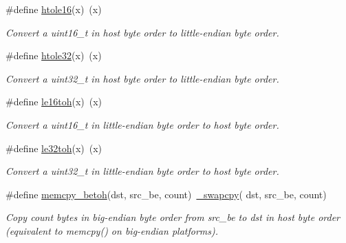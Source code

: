 \begin{DoxyCompactItemize}
\mbox{\label{group__util__byteorder_ga3ea73a6089f61223b225c46e2ba58a47}} 
\#define \hyperlink{group__util__byteorder_ga3ea73a6089f61223b225c46e2ba58a47}{htole16}(x)~(x)
\begin{DoxyCompactList}\small\item\em Convert a uint16\+\_\+t in host byte order to little-\/endian byte order. \end{DoxyCompactList}\item 
\mbox{\label{group__util__byteorder_ga9bea1e76e277f13ae39ac86095510bfa}} 
\#define \hyperlink{group__util__byteorder_ga9bea1e76e277f13ae39ac86095510bfa}{htole32}(x)~(x)
\begin{DoxyCompactList}\small\item\em Convert a uint32\+\_\+t in host byte order to little-\/endian byte order. \end{DoxyCompactList}\item 
\mbox{\label{group__util__byteorder_ga684a5d26d1989cbd925e97292cc81c72}} 
\#define \hyperlink{group__util__byteorder_ga684a5d26d1989cbd925e97292cc81c72}{le16toh}(x)~(x)
\begin{DoxyCompactList}\small\item\em Convert a uint16\+\_\+t in little-\/endian byte order to host byte order. \end{DoxyCompactList}\item 
\mbox{\label{group__util__byteorder_gad2dfbafcefb3add65ea44e581398e90a}} 
\#define \hyperlink{group__util__byteorder_gad2dfbafcefb3add65ea44e581398e90a}{le32toh}(x)~(x)
\begin{DoxyCompactList}\small\item\em Convert a uint32\+\_\+t in little-\/endian byte order to host byte order. \end{DoxyCompactList}\item 
\mbox{\label{group__util__byteorder_gad871f144718432cb04f76e79aec80c87}} 
\#define \hyperlink{group__util__byteorder_gad871f144718432cb04f76e79aec80c87}{memcpy\+\_\+betoh}(dst,  src\+\_\+be,  count)~\hyperlink{group__util__byteorder_ga23fd4d4005a80a26ff3c6ba23a4af560}{\+\_\+swapcpy}( dst, src\+\_\+be, count)
\begin{DoxyCompactList}\small\item\em Copy {\itshape count} bytes in big-\/endian byte order from {\itshape src\+\_\+be} to {\itshape dst} in host byte order (equivalent to memcpy() on big-\/endian platforms). \end{DoxyCompactList}\item 

\end{DoxyCompactItemize}
